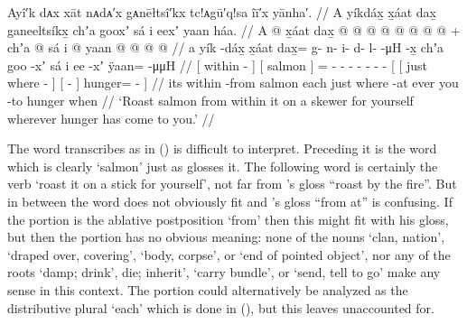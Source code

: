 \ex\label{ex:100-64-roast-for-yourself}%
%
\begingl
	\glpreamble	Ayî′k dᴀx xāt nᴀdᴀ′x gᴀnēłtsî′kx tc!ᴀgū′q!sa îī′x yānha′. //
	\glpreamble	A yíkdáx̱ x̱áat dax̱ ganeeltsíkx̱ chʼa gooxʼ sá i eexʼ yaan háa. //
	\gla	{} A  @ {} {}
		{} x̱áat {}
		dax̱ @
		 @ {} @ {} @ {} @ {} @ {} @ {} @ {} +
		{} {} chʼa  @ {} {} sá 
			{} i  @ {} {}
			yaan @  @ {} @ {} @ {} {} //
	\glb	{} a yík -dáx̱ {}
		{} x̱áat {}
		dax̱=
		g- n- i- d- l-  -μH -x̱
		{} {} chʼa goo -xʼ {} sá 
			{} i ee -xʼ {} 
			ÿaan= {}  -μμH {} {} //
	\glc	{}[  within - {}]
		{}[ salmon {}]
		=
		- - - - -  - -
		{}[ {}[ just where - {}] 
			{}[   - {}]
			hunger= \·  - \· {}] //
	\gld	{} its within -from {} 
		{} salmon {} 
		each
		 {} {} {} {} {} {} {}
		{} {} just where -at {} ever
			{} you {} -to {}
			hunger  {} {} \·when {} //
	\glft	‘Roast salmon from within it on a skewer for yourself wherever hunger has come to you.’
		//
\endgl
\xe

The word \citeauthor{swanton:1909} transcribes as  in (\lastx) is difficult to interpret.
Preceding it is the word  which is clearly  ‘salmon’ just as \citeauthor{swanton:1909} glosses it.
The following word  is certainly the verb  ‘roast it on a stick for yourself’, not far from \citeauthor{swanton:1909}’s gloss “roast by the fire”.
But in between the word  does not obviously fit and \citeauthor{swanton:1909}’s gloss “from at” is confusing.
If the  portion is the ablative postposition  ‘from’ then this might fit with his gloss, but then the  portion has no obvious meaning: none of the nouns  ‘clan, nation’,  ‘draped over, covering’,  ‘body, corpse’, or  ‘end of pointed object’, nor any of the roots  ‘damp; drink’,  die; inherit’,  ‘carry bundle’, or  ‘send, tell to go’ make any sense in this context.
The  portion could alternatively be analyzed as the distributive plural  ‘each’ which is done in (\lastx), but this leaves  unaccounted for.

